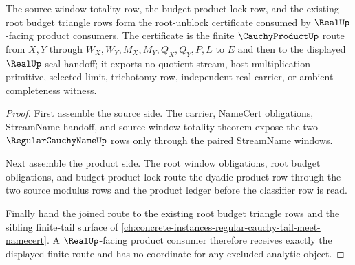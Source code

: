 \begin{theorem}
\label{thm:cauchy-product-root-unblock-certificate}
The source-window totality row, the budget product lock row, and the existing root budget triangle rows form the root-unblock certificate consumed by $\RealUp$-facing product consumers. The certificate is the finite $\CauchyProductUp$ route from $X,Y$ through $W_X,W_Y,M_X,M_Y,Q_X,Q_Y,P,L$ to $E$ and then to the displayed $\RealUp$ seal handoff; it exports no quotient stream, host multiplication primitive, selected limit, trichotomy row, independent real carrier, or ambient completeness witness.
\end{theorem}
\begin{proof}
First assemble the source side. The carrier, NameCert obligations, StreamName handoff, and source-window totality theorem expose the two $\RegularCauchyNameUp$ rows only through the paired StreamName windows.

Next assemble the product side. The root window obligations, root budget obligations, and budget product lock route the dyadic product row through the two source modulus rows and the product ledger before the classifier row is read.

Finally hand the joined route to the existing root budget triangle rows and the sibling finite-tail surface of \autoref{ch:concrete-instances-regular-cauchy-tail-meet-namecert}. A $\RealUp$-facing product consumer therefore receives exactly the displayed finite route and has no coordinate for any excluded analytic object.
\end{proof}

